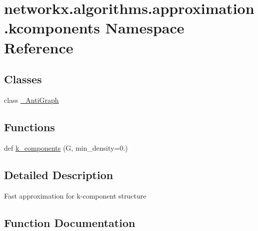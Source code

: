 \hypertarget{namespacenetworkx_1_1algorithms_1_1approximation_1_1kcomponents}{}\section{networkx.\+algorithms.\+approximation.\+kcomponents Namespace Reference}
\label{namespacenetworkx_1_1algorithms_1_1approximation_1_1kcomponents}
\subsection*{Classes}
\begin{DoxyCompactItemize}
\item 
class \hyperlink{classnetworkx_1_1algorithms_1_1approximation_1_1kcomponents_1_1__AntiGraph}{\+\_\+\+Anti\+Graph}
\end{DoxyCompactItemize}
\subsection*{Functions}
\begin{DoxyCompactItemize}
\item 
def \hyperlink{namespacenetworkx_1_1algorithms_1_1approximation_1_1kcomponents_a52b3247595587a79ac6dc695e0d89d03}{k\+\_\+components} (G, min\+\_\+density=0.)
\end{DoxyCompactItemize}


\subsection{Detailed Description}
\begin{DoxyVerb}Fast approximation for k-component structure
\end{DoxyVerb}
 

\subsection{Function Documentation}
\mbox{\label{namespacenetworkx_1_1algorithms_1_1approximation_1_1kcomponents_a52b3247595587a79ac6dc695e0d89d03}} 
